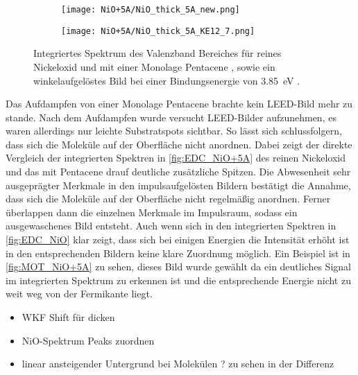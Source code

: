         \begin{figure}
            \centering
            \begin{subfigure}[t]{0.48\textwidth}
                \centering
                \texttt{[image: NiO+5A/NiO\_thick\_5A\_new.png]}
                \subcaption{}
                \label{fig:EDC_NiO+5A}
            \end{subfigure}
            \begin{subfigure}[t]{0.48\textwidth}
                \centering
                \texttt{[image: NiO+5A/NiO\_thick\_5A\_KE12\_7.png]}
                \subcaption{} %
                \label{fig:MOT_NiO+5A}
            \end{subfigure}
            \caption{Integriertes Spektrum des Valenzband Bereiches für reines Nickeloxid und mit einer Monolage Pentacene , sowie ein winkelaufgelöstes Bild bei einer Bindungsenergie von \SI{3.85}{\electronvolt} .}
        \end{figure}
        Das Aufdampfen von einer Monolage Pentacene brachte kein LEED-Bild mehr zu stande.
        Nach dem Aufdampfen wurde versucht LEED-Bilder aufzunehmen, es waren allerdings nur leichte Substratspots sichtbar.
        So lässt sich schlussfolgern, dass sich die Moleküle auf der Oberfläche nicht anordnen.
        Dabei zeigt der direkte Vergleich der integrierten Spektren in \autoref{fig:EDC_NiO+5A} des reinen Nickeloxid und das mit Pentacene drauf deutliche zusätzliche Spitzen.
        Die Abwesenheit sehr ausgeprägter Merkmale in den impulsaufgelösten Bildern bestätigt die Annahme, dass sich die Moleküle auf der Oberfläche nicht regelmäßig anordnen.
        Ferner überlappen dann die einzelnen Merkmale im Impulsraum, sodass ein ausgewaschenes Bild entsteht.
        Auch wenn sich in den integrierten Spektren in \autoref{fig:EDC_NiO} klar zeigt, dass sich bei einigen Energien die Intensität erhöht ist in den entsprechenden Bildern keine klare Zuordnung möglich.
        Ein Beispiel ist in \autoref{fig:MOT_NiO+5A} zu sehen, dieses Bild wurde gewählt da ein deutliches Signal im integrierten Spektrum zu erkennen ist und die entsprechende Energie nicht zu weit weg von der Fermikante liegt.
        \begin{itemize}
            \item WKF Shift für dicken
            \item NiO-Spektrum Peaks zuordnen
            \item linear ansteigender Untergrund bei Molekülen ? zu sehen in der Differenz
        \end{itemize}


